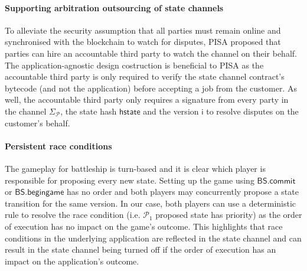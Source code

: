 \documentclass{llncs}
\newcommand{\hstate}{\mathsf{hstate}}
\newcommand{\monotoniccounter}{\mathsf{i}}
\newcommand{\participant}{\mathcal{P}}
\newcommand{\battleshipbegin}{\mathsf{BS.begingame}}
\newcommand{\battleshipcommit}{\mathsf{BS.commit}}
\newcommand{\timerchallenge}{\mathsf{\Delta}_{\mathsf{challenge}}}
\newcommand{\timechallenge}{\mathsf{t}_{\mathsf{challenge}}}
\newcommand{\timerextra}{\mathsf{\Delta}_{\mathsf{extra}}}
\newcommand{\timerdispute}{\mathsf{\Delta}_{\mathsf{dispute}}}
\begin{document}


\paragraph{Supporting arbitration outsourcing of state channels} 
To alleviate the security assumption that all parties must remain online and synchronised with the blockchain to watch for disputes, PISA \cite{mccorry2018pisa} proposed that parties can hire an accountable third party to watch the channel on their behalf. 
The application-agnostic design costruction is beneficial to PISA as the accountable third party is only required to verify the state channel contract's bytecode (and not the application) before accepting a job from the customer. 
As well,  the accountable third party only requires a signature from every party in the channel $\Sigma_{\participant}$, the state hash $\hstate$ and the version $\monotoniccounter$ to resolve disputes on the customer's behalf. 

\paragraph{Persistent race conditions} 
The gameplay for battleship is turn-based and it is clear which player is responsible for proposing every new state. 
Setting up the game using $\battleshipcommit$ or $\battleshipbegin$ has no order and both players may concurrently propose a state transition for the same version. 
In our case, both players can use a deterministic rule to resolve the race condition (i.e. $\participant_{1}$ proposed state has priority) as the order of execution has no impact on the game's outcome. 
This highlights that race conditions in the underlying application are reflected in the state channel and can result in the state channel being turned off if the order of execution has an impact on the application's outcome. 
\end{document}
